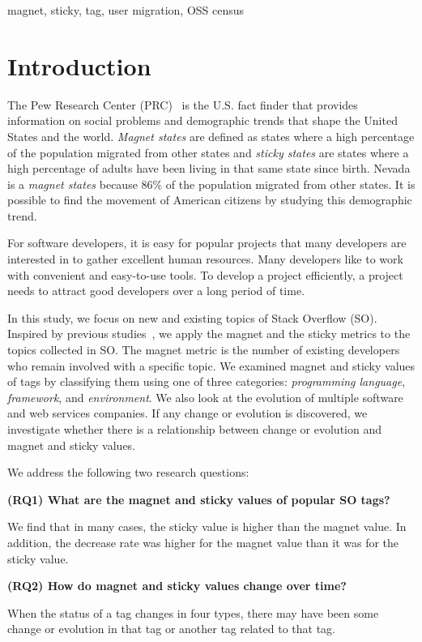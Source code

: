 \documentclass[conference]{IEEEtran}
\begin{document}
\begin{IEEEkeywords}
magnet, sticky, tag, user migration, OSS census
\end{IEEEkeywords}

\section{Introduction}
The Pew Research Center (PRC)~\cite{cohn2009magnet} is the U.S. fact finder that provides information on social problems and demographic trends that shape the United States and the world.  
\emph{Magnet states} are defined as states where a high percentage of the population migrated from other states and \emph{sticky states} are states where a high percentage of adults have been living in that same state since birth. 
Nevada is a \emph{magnet states} because  86\% of the population migrated from other states. It is possible to find the movement of American citizens by studying this demographic trend.

For software developers, it is easy for popular projects that many developers are interested in to gather excellent human resources. Many developers like to work with convenient and easy-to-use tools. To develop a project efficiently, a project needs to attract good developers over a long period of time.

In this study, we focus on new and existing topics of Stack Overflow (SO). Inspired by previous studies~\cite{yamashita2016magnet}, we apply the magnet and the sticky metrics to the topics collected in SO. 
The magnet metric is the number of existing developers who remain involved with a specific topic.
We examined magnet and sticky values of tags by classifying them using one of three categories: \emph{programming language}, \emph{framework}, and \emph{environment}. We also look at the evolution of multiple software and web services companies. If any change or evolution is discovered, we investigate whether there is a relationship between change or evolution and magnet and sticky values.

We address the following two research questions:

\noindent \textbf{(RQ1) What are the magnet and sticky values of popular SO tags?}\par
We find that in many cases, the sticky value is higher than the magnet value. In addition, the decrease rate was higher for the magnet value than it was for the sticky value.

\noindent \textbf{(RQ2) How do magnet and sticky values change over time?}\par
When the status of a tag changes in four types, there may have been some change or evolution in that tag or another tag related to that tag.
\end{document}
